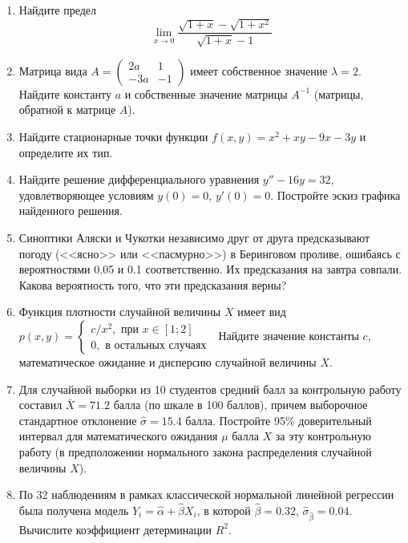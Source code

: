 \documentclass[pdftex,12pt,a4paper]{article}
\begin{document}
\begin{enumerate}
\item  Найдите предел
\begin{equation}
\lim_{x\to 0} \frac{\sqrt{1+x}-\sqrt{1+x^2}}{\sqrt{1+x}-1}
\end{equation}
\item Матрица вида $A=\left(\begin{array}{cc}
2a & 1 \\ 
-3a & -1
\end{array}\right)$ имеет собственное значение $\lambda=2$. Найдите константу $a$ и собственные значение матрицы $A^{-1}$ (матрицы, обратной к матрице $A$).\\
\item Найдите стационарные точки функции $f(x,y)=x^2+xy-9x-3y$  и определите их тип.\\
\item Найдите решение дифференциального уравнения $y''-16y=32$, удовлетворяющее условиям $y(0)=0$, $y'(0)=0$. Постройте эскиз графика найденного решения.\\
\item Синоптики Аляски и Чукотки независимо друг от друга предсказывают погоду (<<ясно>> или <<пасмурно>>) в Беринговом проливе, ошибаясь с вероятностями 0.05 и 0.1 соответственно. Их предсказания на завтра совпали. Какова вероятность того, что эти предсказания верны?\\
\item Функция плотности случайной величины $X$ имеет вид
$p(x,y)=\begin{cases}
c/x^2,\text{ при } x\in [1;2]\\
0,\text{ в остальных случаях }
\end{cases}$
Найдите значение константы $c$, математическое ожидание и дисперсию случайной величины $X$.\\
\item Для случайной выборки из 10 студентов средний балл за контрольную работу составил $\bar{X}=71.2$ балла (по шкале в 100 баллов), причем выборочное стандартное отклонение $\hat{\sigma}=15.4$ балла. Постройте 95\% доверительный интервал для математического ожидания $\mu$ балла $X$ за эту контрольную работу (в предположении нормального закона распределения случайной величины $X$).\\ 
\item По 32 наблюдениям в рамках классической нормальной линейной регрессии была получена модель $\hat{Y}_i=\hat{\alpha}+\hat{\beta}X_i$, в которой $\hat{\beta}=0.32$, $\hat{\sigma}_{\hat{\beta}}=0.04$. Вычислите коэффициент детерминации $R^2$.
\end{enumerate}
\end{document}
